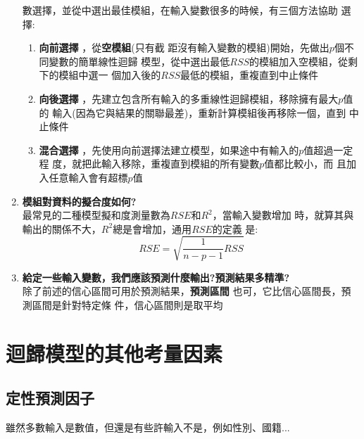 \documentclass{report} %
\begin{document}
\begin{enumerate}
            數選擇，並從中選出最佳模組，在輸入變數很多的時候，有三個方法協助
            選擇:
          \begin{enumerate}
            \item {\bf 向前選擇}
              ，從{\bf 空模組}(只有截
              距沒有輸入變數的模組)開始，先做出$p$個不同變數的簡單線性迴歸
              模型，從中選出最低$RSS$的模組加入空模組，從剩下的模組中選一
              個加入後的$RSS$最低的模組，重複直到中止條件
            \item {\bf 向後選擇}
              ，先建立包含所有輸入的多重線性迴歸模組，移除擁有最大$p$值的
              輸入(因為它與結果的關聯最差)，重新計算模組後再移除一個，直到
              中止條件
            \item {\bf 混合選擇}
              ，先使用向前選擇法建立模型，如果途中有輸入的$p$值超過一定程
              度，就把此輸入移除，重複直到模組的所有變數$p$值都比較小，而
              且加入任意輸入會有超標$p$值
          \end{enumerate}
        \item {\bf 模組對資料的擬合度如何?} \\
          最常見的二種模型擬和度測量數為$RSE$和$R ^ 2$，當輸入變數增加
            時，就算其與輸出的關係不大，$R ^ 2$總是會增加，通用$RSE$的定義
            是:
          \begin{equation}
            RSE = \sqrt{\frac{1}{n - p - 1}RSS}
          \end{equation}
        \item {\bf 給定一些輸入變數，我們應該預測什麼輸出?預測結果多精準?} \\
          除了前述的信心區間可用於預測結果，{\bf 預測區間}
            也可，它比信心區間長，預測區間是針對特定條
            件，信心區間則是取平均
      \end{enumerate}
  \section{迴歸模型的其他考量因素}
    \subsection{定性預測因子}
      雖然多數輸入是數值，但還是有些許輸入不是，例如性別、國籍...
\end{document}
